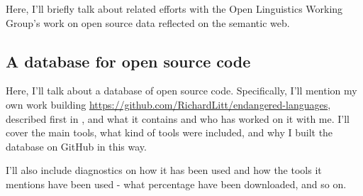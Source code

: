 Here, I'll briefly talk about related efforts with the Open Linguistics Working Group's \citep{chiarcos2012open} work on open source data reflected on the semantic web.\citep{chiarcos2013building}

\subsection{A database for open source code}
\label{sec:solutions}

Here, I'll talk about a database of open source code. Specifically, I'll mention my own work building \href{https://github.com/RichardLitt/endangered-languages}{https://github.com/RichardLitt/endangered-languages}, described first in \citet{CCURL}, and what it contains and who has worked on it with me. I'll cover the main tools, what kind of tools were included, and why I built the database on GitHub in this way.

I'll also include diagnostics on how it has been used and how the tools it mentions have been used - what percentage have been downloaded, and so on.



%


